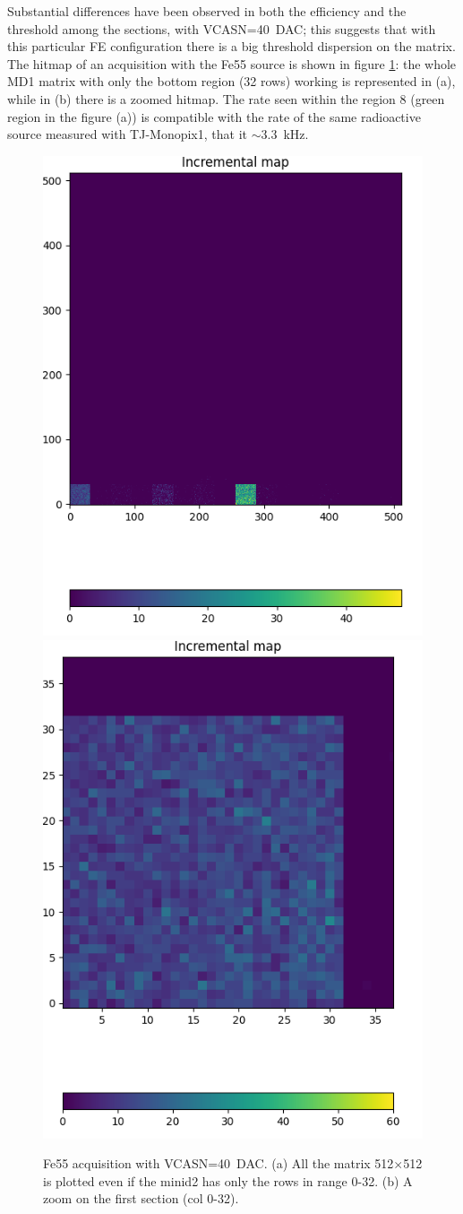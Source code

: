     Substantial differences have been observed in both the efficiency and the threshold among the sections, with VCASN=\SI{40}{DAC}; this suggests that with this particular FE configuration there is a big threshold dispersion on the matrix.  
    The hitmap of an acquisition with the Fe55 source is shown in figure \ref{fig:ARCADIA_Fe55}: the whole MD1 matrix with only the bottom region (32 rows) working is represented in (a), while in (b) there is a zoomed hitmap. The rate seen within the region 8 (green region in the figure (a)) is compatible with the rate of the same radioactive source measured with TJ-Monopix1, that it $\sim$\SI{3.3}{kHz}. 
    \begin{figure}[h!]
        \centering
        \includegraphics[width=.49\linewidth]{figures/charaterization/ARCADIA/Fe55_5min30s.png}
        \includegraphics[width=.47\linewidth]{figures/charaterization/ARCADIA/Fe55_6min30s.png}
        \caption{Fe55 acquisition with VCASN=\SI{40}{DAC}. (a) All the matrix 512$\times$512 is plotted even if the minid2 has only the rows in range 0-32. (b) A zoom on the first section (col 0-32).   }
        \label{fig:ARCADIA_Fe55}
    \end{figure}  
